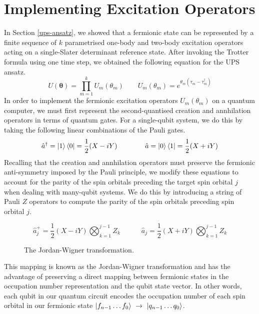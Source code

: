 \section{Implementing Excitation Operators}%
\label{implementing-excitation-operators}

In Section \ref{ups-ansatz}, we showed that a fermionic state can be represented by a finite sequence of $k$ parametrised one-body and two-body excitation operators acting on a single-Slater determinant reference state. After invoking the Trotter formula using one time step, we obtained the following equation for the UPS ansatz.
\begin{equation*}
    U(\bm\theta) = \prod_{m=1}^k U_m(\theta_m) \qquad
    U_m(\theta_m) = e^{\theta_m (\tau_m - \tau_m^\dagger)}
\end{equation*}
In order to implement the fermionic excitation operators $U_m(\theta_m)$ on a quantum computer, we must first represent the second-quantised creation and annhilation operators in terms of quantum gates. For a single-qubit system, we do this by taking the following linear combinations of the Pauli gates.
\begin{equation*}
    \hat a^\dagger = \ket 1 \bra 0 = \frac{1}{2} (X - iY) \qquad\qquad
    \hat a = \ket 0 \bra 1 = \frac{1}{2} (X + iY) 
\end{equation*}
Recalling that the creation and annhilation operators must preserve the fermionic anti-symmetry imposed by the Pauli principle, we modify these equations to account for the parity of the spin orbitals preceding the target spin orbital $j$ when dealing with many-qubit systems. We do this by introducing a string of Pauli $Z$ operators to compute the parity of the spin orbitals preceding spin orbital $j$.

\begin{figure}[H]
    \centering
    \begin{equation*}
        \hat a_j^+ = \frac{1}{2} (X - iY) \bigotimes_{k=1}^{j-1} Z_k \qquad\quad
        \hat a_j = \frac{1}{2} (X + iY) \bigotimes_{k=1}^{j-1} Z_k
    \end{equation*}
    \caption{The Jordan-Wigner transformation.}
    \label{jordan-wigner}
\end{figure}

This mapping is known as the Jordan-Wigner transformation \cite{Seeley2020} and has the advantage of preserving a direct mapping between fermionic states in the occupation number representation and the qubit state vector. In other words, each qubit in our quantum circuit encodes the occupation number of each spin orbital in our fermionic state $\ket{f_{n-1} \dots f_{0}} \,\,\rightarrow\,\, \ket{q_{n-1} \dots q_{0}}$.

